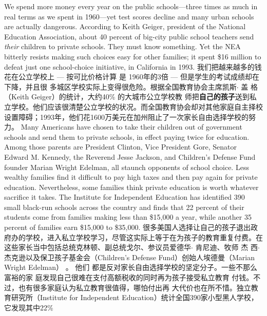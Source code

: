 \begin{paracol}{2}
We spend more money every year on the public schools---three
times as much in real terms as we spent in 1960---yet test
scores decline and many urban schools are actually dangerous.
According to Keith Geiger, president of the National Education
Association, about 40 percent of big-city public school teachers
send \textit{their} children to private schools. They must know something. Yet the NEA bitterly resists making such choices easy for
other families; it spent \$16 million to defeat just one school-choice initiative, in California in 1993.
\switchcolumn
我们把越来越多的钱花在公立学校上 --- 按可比价格计算
是 1960年的3倍 --- 但是学生的考试成绩却在下降，并且很
多城区学校实际上变得很危险。根据全国教育协会主席凯斯$\cdot$
盖 格（Keith Geiger）的统计，大约40\% 的大城市公立学校教
师把\textbf{自己的孩子}送到私立学校。他们应该很清楚公立学校的状况。而全国教育协会却对其他家庭自主择校设置障碍；1993年，他们花1600万美元在加州阻止了一次家长自由选择学校的努力。
\switchcolumn*
Many Americans have chosen to take their children out of
government schools and send them to private schools, in effect
paying twice for education. Among those parents are President
Clinton, Vice President Gore, Senator Edward M. Kennedy, the
Reverend Jesse Jackson, and Children's Defense Fund founder
Marian Wright Edelman, all staunch opponents of school
choice. Less wealthy families find it difficult to pay high taxes
and then pay again for private education. Nevertheless, some
families think private education is worth whatever sacrifice it
takes. The Institute for Independent Education has identified
390 small black-run schools across the country and finds that
22 percent of their students come from families making less
than \$15,000 a year, while another 35 percent of families earn
\$15,000 to \$35,000.
\switchcolumn
很多美国人选择让自己的孩子退出政府办的学校，进入私立学校学习，尽管这实际上等于在为孩子的教育重复付费。在
这些家长当中包括总统克林顿、副总统戈尔、参议员爱德华$\cdot$
肯尼迪、牧师 杰 西$\cdot$杰克逊以及保卫孩子基金会（Children’s
Defense Fund）创始人埃德曼（Marian Wright Edelman） 。 他们
都是反对家长自由选择学校的坚定分子。一些不那么富裕的家
庭发现自己很难在支付高额税收的同时再为孩子接受私立教育
付钱。不过，也有很多家庭认为私立教育很值得，哪怕付出再
大代价也在所不惜。独立教育研究所（Institute for Independent
Education）统计全国390家小型黑人学校，它发现其中22\%

\end{paracol}
